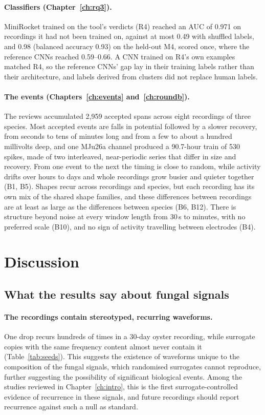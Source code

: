 \paragraph{Classifiers (Chapter~\ref{ch:rq3}).} MiniRocket trained on the tool's verdicts (R4) reached an AUC of 0.971 on recordings it had not been trained on, against at most 0.49 with shuffled labels, and 0.98 (balanced accuracy 0.93) on the held-out M4, scored once, where the reference CNNs reached 0.59--0.66. A CNN trained on R4's own examples matched R4, so the reference CNNs' gap lay in their training labels rather than their architecture, and labels derived from clusters did not replace human labels.

\paragraph{The events (Chapters~\ref{ch:events} and~\ref{ch:roundb}).} The reviews accumulated 2,959 accepted spans across eight recordings of three species. Most accepted events are falls in potential followed by a slower recovery, from seconds to tens of minutes long and from a few to about a hundred millivolts deep, and one MJu26a channel produced a 90.7-hour train of 530 spikes, made of two interleaved, near-periodic series that differ in size and recovery. From one event to the next the timing is close to random, while activity drifts over hours to days and whole recordings grow busier and quieter together (B1, B5). Shapes recur across recordings and species, but each recording has its own mix of the shared shape families, and these differences between recordings are at least as large as the differences between species (B6, B12). There is structure beyond noise at every window length from 30\,s to minutes, with no preferred scale (B10), and no sign of activity travelling between electrodes (B4).

\section{Discussion}

\subsection{What the results say about fungal signals}

\paragraph{The recordings contain stereotyped, recurring waveforms.} One drop recurs hundreds of times in a 30-day oyster recording, while surrogate copies with the same frequency content almost never contain it (Table~\ref{tab:seeds}). This suggests the existence of waveforms unique to the composition of the fungal signals, which randomised surrogates cannot reproduce, further suggesting the possibility of significant biological events. Among the studies reviewed in Chapter~\ref{ch:intro}, this is the first surrogate-controlled evidence of recurrence in these signals, and future recordings should report recurrence against such a null as standard.


